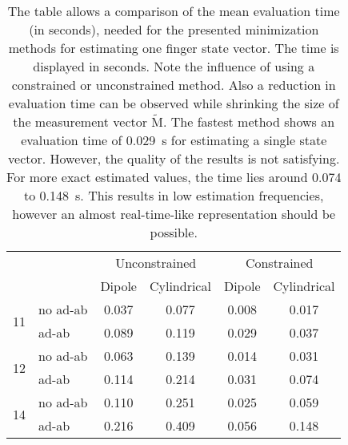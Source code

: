 \begin{table}[!htb]
\centering
\begin{tabular}{l l c c c c}
\toprule
 & &         			\multicolumn{2}{c}{Unconstrained}		 & 	\multicolumn{2}{c}{Constrained}\\ \cmidrule(lr){3-4} \cmidrule(lr){5-6}
 & & 								Dipole & Cylindrical & Dipole & Cylindrical \\ \midrule[2pt]
\multirow{2}{*}{11} & no ad-ab    & 0.037 & 0.077 & 0.008 & 0.017 \\ 
					& ad-ab		 & 0.089  & 0.119 & 0.029 & 0.037 \\ \midrule
\multirow{2}{*}{12} & no ad-ab    & 0.063 & 0.139 & 0.014 & 0.031 \\ 
					& ad-ab		 & 0.114 & 0.214 & 0.031 & 0.074  \\ \midrule
\multirow{2}{*}{14} & no ad-ab    & 0.110 &  0.251 & 0.025 & 0.059 \\ 
					& ad-ab		 & 0.216 & 0.409 & 0.056 & 0.148 \\										
\bottomrule
\end{tabular}
\caption[Time for one estimation step of one finger state vector]
{The table allows a comparison of the mean evaluation time (in seconds), needed for the presented minimization methods for estimating one finger state vector. The time is displayed in seconds. Note the influence of using a constrained or unconstrained method. Also a reduction in evaluation time can be observed while shrinking the size of the measurement vector $ \tilde{\mathrm{M}} $. The fastest method shows an evaluation time of \SI{0.029}{\second} for estimating a single state vector. However, the quality of the results is not satisfying. For more exact estimated values, the time lies around 0.074 to \SI{0.148}{\second}. This results in low estimation frequencies, however an almost real-time-like representation should be possible.}
\label{tab:timeOneFing}
\end{table}

